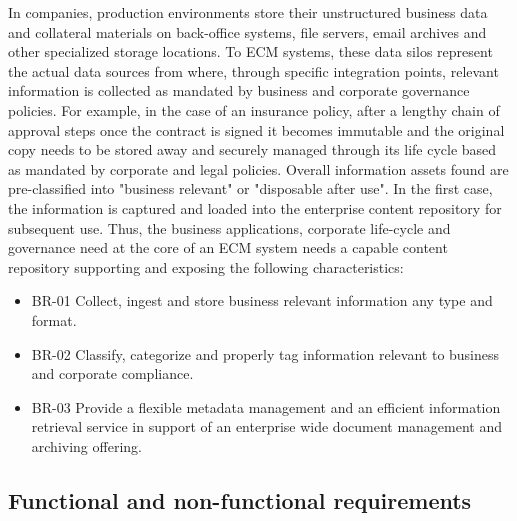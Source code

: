 \documentclass[EPiC]{easychair} %
\begin{document}
    \noindent In companies, production environments store their unstructured business data and collateral materials on  back-office systems, file servers, email archives and other specialized storage locations. To ECM systems, these data silos represent the actual data sources from where, through specific integration points, relevant information is collected as mandated by business and corporate governance policies. For example, in the case of an insurance policy, after a lengthy chain of approval steps once the contract is signed it becomes immutable and the original copy needs to be stored away and securely managed through its life cycle based as mandated by corporate and legal policies. Overall information assets found are pre-classified into "business relevant" or "disposable after use". In the first case, the information is captured and loaded into the enterprise content repository for subsequent use. Thus, the business applications, corporate life-cycle and governance need at the core of an ECM system needs a capable content repository supporting and exposing the following characteristics:
\begin{itemize}
    \item BR-01 Collect, ingest and store business relevant information any type and format.
    \item BR-02 Classify, categorize and properly tag information relevant to business and corporate compliance.
    \item BR-03 Provide a flexible metadata management and an efficient information retrieval service in support of an enterprise wide document management and archiving offering.
\end{itemize}

\subsection{ Functional and non-functional requirements } 
\label{sect:functional-requirements}
\end{document}
